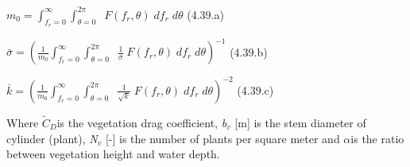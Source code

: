 $m_{0} =\int _{f_{r} =0}^{\infty }\int _{\theta =0}^{2\pi }\;  \;  F(f_{r} ,\theta )\; df_{r} \; d\theta $ (4.39.a)

$\bar{\sigma }=\left(\frac{1}{m_{0} } \int _{f_{r} =0}^{\infty }\int _{\theta =0}^{2\pi }\;  \; \frac{1}{\sigma } \;  F(f_{r} ,\theta )\; df_{r} \; d\theta \right)^{-1} $ (4.39.b)

$\bar{k}=\left(\frac{1}{m_{0} } \int _{f_{r} =0}^{\infty }\int _{\theta =0}^{2\pi }\;  \; \frac{1}{\sqrt{k} } \;  F(f_{r} ,\theta )\; df_{r} \; d\theta \right)^{-2} $ (4.39.c)

 Where $\tilde{C}_{D} $is the vegetation drag coefficient, \textit{b${}_{v}$} [m] is the stem diameter of cylinder (plant), \textit{N${}_{v}$} [-] is the number of plants per square meter and $\alpha $is the ratio between vegetation height and water depth.


